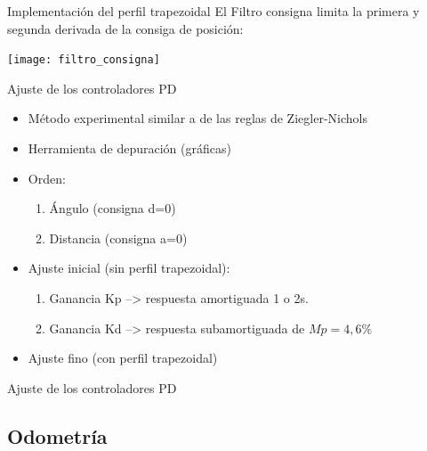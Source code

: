 \documentclass{beamer}
\begin{document}
\begin{frame}{Implementación del perfil trapezoidal}
El Filtro consigna limita la primera y segunda derivada de la consiga de posición:
\begin{center}
\texttt{[image: filtro\_consigna]}
\end{center}
\end{frame}

\begin{frame}{Ajuste de los controladores PD}
\begin{itemize}
\item<1-> Método experimental similar a de las reglas de Ziegler-Nichols
\item<1-> Herramienta de depuración (gráficas)
\item<2-> Orden:
	\begin{enumerate}
	\item Ángulo (consigna d=0)
	\item Distancia (consigna a=0)
	\end{enumerate} 
\item<3-> Ajuste inicial (sin perfil trapezoidal):
	\begin{enumerate}
	\item Ganancia Kp --> respuesta amortiguada 1 o 2s.
	\item Ganancia Kd --> respuesta subamortiguada de $Mp = 4,6\%$
	\end{enumerate}
\item<4-> Ajuste fino (con perfil trapezoidal)
\end{itemize}
\end{frame}

\begin{frame}{Ajuste de los controladores PD}
\begin{center}
\end{center}
\end{frame}


\subsection{Odometría}
\end{document}
